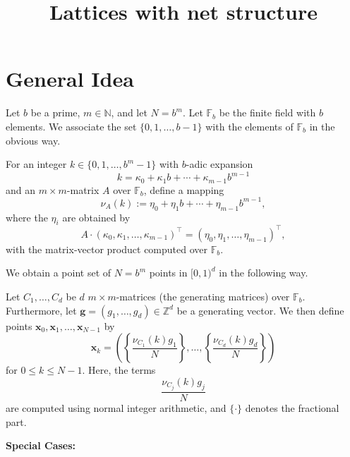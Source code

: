 \documentclass[11pt,a4paper]{article}
\newcommand{\bsx}{\boldsymbol{x}}
\newcommand{\bsg}{\boldsymbol{g}}
\newcommand{\NN}{\mathbb{N}}
\newcommand{\ZZ}{\mathbb{Z}}
\newcommand{\FF}{\mathbb{F}}
\begin{document}
\title{Lattices with net structure}

\maketitle

\section{General Idea}

Let $b$ be a prime, $m\in\NN$, and let $N=b^m$. Let $\FF_b$ be the finite field with $b$ elements. We associate 
the set $\{0,1,\ldots,b-1\}$ with the elements of $\FF_b$ in the obvious way.

For an integer $k\in\{0,1,\ldots,b^m-1\}$ with $b$-adic expansion
$$
k=\kappa_0 +\kappa_1 b + \cdots + \kappa_{m-1} b^{m-1}
$$
and an $m\times m$-matrix $A$ over $\FF_b$, define a mapping 
$$
 \nu_A (k):= \eta_0 + \eta_1 b + \cdots + \eta_{m-1} b^{m-1},
$$
where the $\eta_i$ are obtained by 
$$
A \cdot (\kappa_0,\kappa_1,\ldots,\kappa_{m-1})^\top=(\eta_0,\eta_1,\ldots,\eta_{m-1})^\top,
$$
with the matrix-vector product computed over $\FF_b$. 

\medskip

We obtain a point set of $N=b^m$ points in $[0,1)^d$ in the following way.

Let $C_1,\ldots,C_d$ be $d$ $m\times m$-matrices (the generating matrices) 
over $\FF_b$. Furthermore, let $\bsg=(g_1,\ldots,g_d)\in\ZZ^d$ be a generating vector. We then define 
points $\bsx_0,\bsx_1,\ldots,\bsx_{N-1}$ by
$$
 \bsx_k =\left(\left\{\frac{\nu_{C_1} (k) g_1}{N}\right\},\ldots,\left\{\frac{\nu_{C_d} (k) g_d}{N}\right\}\right)
$$
for $0\le k\le N-1$. Here, the terms 
$$
\frac{\nu_{C_j} (k) g_j}{N}
$$
are computed using normal integer arithmetic, and $\{\cdot\}$ denotes the fractional part. 


\medskip

\textbf{Special Cases:}
\end{document}
